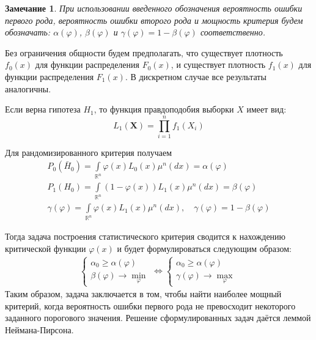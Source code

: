 \documentclass[oneside,final,14pt]{extreport}
\newtheorem*{rmrk}{Замечание}
\theoremstyle{definition}
\begin{document}
\begin{rmrk}
При использовании введенного обозначения вероятность ошибки первого рода, вероятность ошибки второго рода и мощность критерия будем обозначать: $\alpha(\varphi)$, $\beta(\varphi)$ и $\gamma(\varphi)=1-\beta(\varphi)$ соответственно.
\end{rmrk}

Без ограничения общности будем предполагать, что существует плотность $f_{0}(x)$ для функции распределения $F_{0}(x)$, и существует плотность $f_{1}(x)$ для функции распределения $F_{1}(x)$. В дискретном случае все результаты аналогичны.

Если верна гипотеза $H_1$, то функция правдоподобия выборки $X$ имеет вид:
\begin{equation*}
    L_{1}\left(\mathbf{X}\right)=\prod_{i=1}^{n} f_{1}\left(X_{i}\right)
\end{equation*}

Для рандомизированного критерия получаем
\begin{gather*}
    P_{0}\left(\bar{H}_{0}\right)=\int\limits_{\mathbb{R}^{n}} \varphi(x) L_{0}(x) \mu^{n}(d x)=\alpha(\varphi) \\
    P_{1}\left(H_{0}\right)=\int\limits_{\mathbb{R}^{n}}(1-\varphi(x)) L_{1}(x) \mu^{n}(d x)=\beta(\varphi) \\
    \gamma(\varphi)=\int\limits_{\mathbb{R}^{n}} \varphi(x) L_{1}(x) \mu^{n}(d x), \quad \gamma(\varphi)=1-\beta(\varphi)
\end{gather*}

Тогда задача построения статистического критерия сводится к нахождению критической функции $\varphi(x)$ и будет формулироваться следующим образом:
\begin{equation*}
    \begin{array}{l}
    \left\{\begin{array}{l}
    \alpha_{0} \geqslant \alpha(\varphi) \\
    \beta(\varphi) \rightarrow \min\limits_{\varphi}
    \end{array}\right.
    \Leftrightarrow
    \left\{\begin{array}{l}
    \alpha_{0} \geqslant \alpha(\varphi) \\
    \gamma(\varphi) \rightarrow \max\limits_{\varphi}
    \end{array}\right.
    \end{array}
\end{equation*}
Таким образом, задача заключается в том, чтобы найти наиболее мощный критерий, когда вероятность ошибки первого рода не превосходит некоторого заданного порогового значения. Решение сформулированных задач даётся леммой Неймана-Пирсона.
\end{document}
